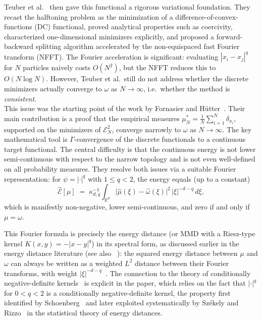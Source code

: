 \documentclass[12pt,a4paper,oneside]{amsart}
\theoremstyle{plain}
\theoremstyle{definition}
\numberwithin{equation}{section}
\numberwithin{figure}{section}
\numberwithin{table}{section}
\theoremstyle{remark}
\newcommand{\R}{\mathbb{R}}
\begin{document}
Teuber et al.~\cite{teuber2011dithering} then gave this functional a rigorous
variational foundation. They recast the halftoning problem as the minimization of a
difference-of-convex-functions (DC) functional, proved analytical properties such as
coercivity, characterized one-dimensional minimizers explicitly, and proposed a
forward-backward splitting algorithm accelerated by the non-equispaced fast Fourier
transform (NFFT). The Fourier acceleration is significant: evaluating $|x_i - x_j|^q$
for $N$ particles naively costs $O(N^2)$, but the NFFT reduces this to $O(N \log N)$.
However, Teuber et al.\ still do not address whether the discrete minimizers actually
converge to $\omega$ as $N \to \infty$, i.e.\ whether the method is \emph{consistent}.
\\
This issue was the starting point of the work by Fornasier and H\"utter~\cite{fornasier2014consistency}. Their main contribution is a proof that the empirical measures
$\mu_N^* = \frac1N\sum_{i=1}^N \delta_{x_i}$, supported on the minimizers of
$\mathcal{E}_N^2$, converge narrowly to $\omega$ as $N \to \infty$.
The key mathematical tool is $\Gamma$-convergence of the discrete functionals to a
continuous target functional. The central difficulty is that the continuous energy is
not lower semi-continuous with respect to the narrow topology and is not even
well-defined on all probability measures. They resolve both issues via a suitable
Fourier representation: for $\psi = |\cdot|^q$ with $1 \le q < 2$, the energy
equals (up to a constant)
\[
  \widehat{\mathcal{E}}[\mu]
  \;=\;
  \kappa_{d,q}^{-1}
  \int_{\R^d}
  \bigl|\hat{\mu}(\xi) - \hat{\omega}(\xi)\bigr|^2
  \,|\xi|^{-d-q}\,d\xi,
\]
which is manifestly non-negative, lower semi-continuous, and zero if and only if
$\mu = \omega$.
 
This Fourier formula is precisely the energy distance (or MMD with a
Riesz-type kernel $K(x,y) = -|x-y|^q$) in its spectral form, as discussed earlier in the
energy distance literature (see also ~\cite[Chapter 3, Section 2, Corollary 2.10]{BergChristensenRessel1984}): the squared energy distance between $\mu$ and $\omega$
can always be written as a weighted $L^2$ distance between their Fourier transforms,
with weight $|\xi|^{-d-q}$~\cite{szekely2013energy}. The connection to the theory
of conditionally negative-definite kernels~\cite{schoenberg1938monotone,schoenberg1938positive}
is explicit in the paper, which relies on the fact that $|\cdot|^q$ for $0 < q < 2$
is a conditionally negative-definite kernel, the property first identified by
Schoenberg~\cite{schoenberg1938monotone,schoenberg1938positive} and later exploited
systematically by Sz\'ekely and Rizzo~\cite{szekely2007measuring,szekely2013energy}
in the statistical theory of energy distances. 
\end{document}
